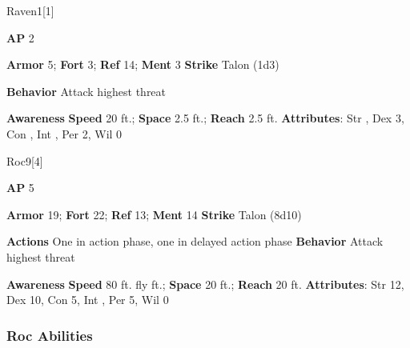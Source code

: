 \begin{monsection}{Raven}{1}[1]
\vspace{-1em}\vspace{-1em}
\begin{spellcontent}
\begin{spelltargetinginfo}
{\textbf{AP} 2}

\pari \textbf{Armor} 5;
\textbf{Fort} 3;
\textbf{Ref} 14;
\textbf{Ment} 3
\pari \textbf{Strike} Talon  (1d3)



\pari \textbf{Behavior} Attack highest threat
\end{spelltargetinginfo}
\end{spellcontent}

\begin{monsterfooter}
\pari \textbf{Awareness} 
\pari \textbf{Speed} 20 ft.;
\textbf{Space} 2.5 ft.;
\textbf{Reach} 2.5 ft.
\pari \textbf{Attributes}:
Str ,
Dex 3,
Con ,
Int ,
Per 2,
Wil 0
\end{monsterfooter}
\end{monsection}

\begin{monsection}{Roc}{9}[4]
\vspace{-1em}\vspace{-1em}
\begin{spellcontent}
\begin{spelltargetinginfo}
{\textbf{AP} 5}

\pari \textbf{Armor} 19;
\textbf{Fort} 22;
\textbf{Ref} 13;
\textbf{Ment} 14
\pari \textbf{Strike} Talon  (8d10)


\pari \textbf{Actions} One in action phase, one in delayed action phase
\pari \textbf{Behavior} Attack highest threat
\end{spelltargetinginfo}
\end{spellcontent}

\begin{monsterfooter}
\pari \textbf{Awareness} 
\pari \textbf{Speed} 80 ft. fly ft.;
\textbf{Space} 20 ft.;
\textbf{Reach} 20 ft.
\pari \textbf{Attributes}:
Str 12,
Dex 10,
Con 5,
Int ,
Per 5,
Wil 0
\end{monsterfooter}
\end{monsection}


\subsubsection{Roc Abilities}

